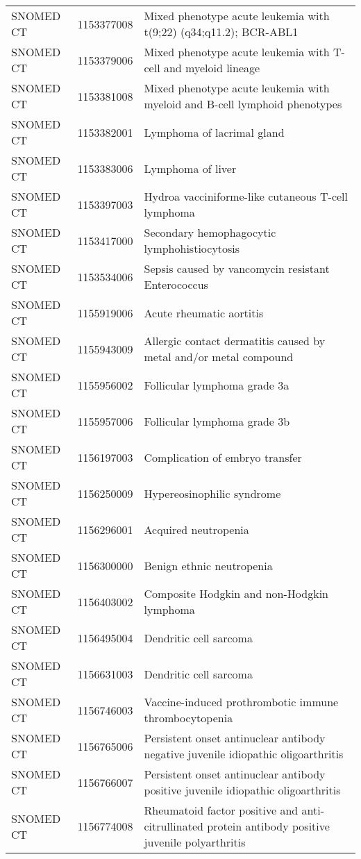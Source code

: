 \begin{longtable}{p{}p{}p{}}
  SNOMED CT & 1153377008 & Mixed phenotype acute leukemia with t(9;22) (q34;q11.2); BCR-ABL1 \\ 
  SNOMED CT & 1153379006 & Mixed phenotype acute leukemia with T-cell and myeloid lineage \\ 
  SNOMED CT & 1153381008 & Mixed phenotype acute leukemia with myeloid and B-cell lymphoid phenotypes \\ 
  SNOMED CT & 1153382001 & Lymphoma of lacrimal gland \\ 
  SNOMED CT & 1153383006 & Lymphoma of liver \\ 
  SNOMED CT & 1153397003 & Hydroa vacciniforme-like cutaneous T-cell lymphoma \\ 
  SNOMED CT & 1153417000 & Secondary hemophagocytic lymphohistiocytosis \\ 
  SNOMED CT & 1153534006 & Sepsis caused by vancomycin resistant Enterococcus \\ 
  SNOMED CT & 1155919006 & Acute rheumatic aortitis \\ 
  SNOMED CT & 1155943009 & Allergic contact dermatitis caused by metal and/or metal compound \\ 
  SNOMED CT & 1155956002 & Follicular lymphoma grade 3a \\ 
  SNOMED CT & 1155957006 & Follicular lymphoma grade 3b \\ 
  SNOMED CT & 1156197003 & Complication of embryo transfer \\ 
  SNOMED CT & 1156250009 & Hypereosinophilic syndrome \\ 
  SNOMED CT & 1156296001 & Acquired neutropenia \\ 
  SNOMED CT & 1156300000 & Benign ethnic neutropenia \\ 
  SNOMED CT & 1156403002 & Composite Hodgkin and non-Hodgkin lymphoma \\ 
  SNOMED CT & 1156495004 & Dendritic cell sarcoma \\ 
  SNOMED CT & 1156631003 & Dendritic cell sarcoma \\ 
  SNOMED CT & 1156746003 & Vaccine-induced prothrombotic immune thrombocytopenia \\ 
  SNOMED CT & 1156765006 & Persistent onset antinuclear antibody negative juvenile idiopathic oligoarthritis \\ 
  SNOMED CT & 1156766007 & Persistent onset antinuclear antibody positive juvenile idiopathic oligoarthritis \\ 
  SNOMED CT & 1156774008 & Rheumatoid factor positive and anti-citrullinated protein antibody positive juvenile polyarthritis \\ 

\end{longtable}
